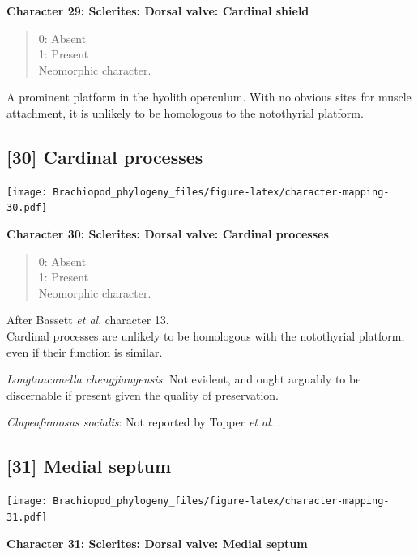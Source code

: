 \documentclass[openany]{book}
\theoremstyle{definition}
\theoremstyle{definition}
\theoremstyle{definition}
\theoremstyle{remark}
\begin{document}
\textbf{Character 29: Sclerites: Dorsal valve: Cardinal shield}

\begin{quote}
0: Absent\\
1: Present\\
Neomorphic character.
\end{quote}

A prominent platform in the hyolith operculum. With no obvious sites for
muscle attachment, it is unlikely to be homologous to the notothyrial
platform.

\hypertarget{cardinal-processes}{%
\subsection*{{[}30{]} Cardinal processes}\label{cardinal-processes}}

\texttt{[image: Brachiopod\_phylogeny\_files/figure-latex/character-mapping-30.pdf]}

\textbf{Character 30: Sclerites: Dorsal valve: Cardinal processes}

\begin{quote}
0: Absent\\
1: Present\\
Neomorphic character.
\end{quote}

After Bassett \emph{et al}.
\citeyearpar{Bassett2001Functionalmorphology} character 13.\\
Cardinal processes are unlikely to be homologous with the notothyrial
platform, even if their function is similar.

\emph{Longtancunella chengjiangensis}: Not evident, and ought arguably
to be discernable if present given the quality of preservation.

\emph{Clupeafumosus socialis}: Not reported by Topper \emph{et al}.
\citeyearpar{Topper2013Reappraisalof}.

\hypertarget{medial-septum}{%
\subsection*{{[}31{]} Medial septum}\label{medial-septum}}

\texttt{[image: Brachiopod\_phylogeny\_files/figure-latex/character-mapping-31.pdf]}

\textbf{Character 31: Sclerites: Dorsal valve: Medial septum}
\end{document}
